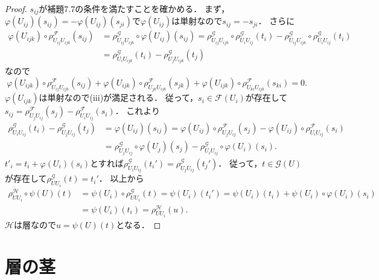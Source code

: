 \begin{proof}
  $s_{ij}$が補題7.7の条件を満たすことを確かめる．
  まず，$\varphi(U_{ij})(s_{ij}) = - \varphi(U_{ij})(s_{ji})$で$\varphi(U_{ij})$は単射なので$s_{ij} = - s_{ji}$．
  さらに
  \begin{align*}
    \varphi(U_{ijk}) \circ \rho^\mathscr{F}_{U_{ij}U_{ijk}}(s_{ij})
    &= \rho^\mathscr{G}_{U_{ij}U_{ijk}} \circ \varphi(U_{ij})(s_{ij})
    = \rho^\mathscr{G}_{U_{ij}U_{ijk}} \circ \rho^\mathscr{G}_{U_iU_{ij}}(t_i)
    - \rho^\mathscr{G}_{U_{ij}U_{ijk}} \circ \rho^\mathscr{G}_{U_iU_{ij}}(t_i) \\
    &= \rho^\mathscr{G}_{U_iU_{ijk}}(t_i) - \rho^\mathscr{G}_{U_jU_{ijk}}(t_j)
  \end{align*}
  なので
  \[
  \varphi(U_{ijk}) \circ \rho^\mathscr{F}_{U_{ij}U_{ijk}}(s_{ij})
  + \varphi(U_{ijk}) \circ \rho^\mathscr{F}_{U_{jk}U_{ijk}}(s_{jk})
  + \varphi(U_{ijk}) \circ \rho^\mathscr{F}_{U_{ki}U_{ijk}}(s_{ki})
  = 0 .
  \]
  $\varphi(U_{ijk})$は単射なので(iii)が満足される．
  従って，$s_i \in \mathscr{F}(U_i)$が存在して$s_{ij} = \rho^\mathscr{F}_{U_jU_{ij}}(s_j) - \rho^\mathscr{F}_{U_iU_{ij}}(s_i)$．
  これより
  \begin{align*}
    \rho^\mathscr{G}_{U_iU_{ij}}(t_i) - \rho^\mathscr{G}_{U_jU_{ij}}(t_j) &= \varphi(U_{ij})(s_{ij})
    = \varphi(U_{ij}) \circ \rho^\mathscr{F}_{U_jU_{ij}}(s_j) - \varphi(U_{ij}) \circ \rho^\mathscr{F}_{U_iU_{ij}}(s_i) \\
    &= \rho^\mathscr{G}_{U_jU_{ij}} \circ \varphi(U_j)(s_j) - \rho^\mathscr{G}_{U_iU_{ij}} \circ \varphi(U_i)(s_i) .
  \end{align*}
  $t'_i = t_i + \varphi(U_i)(s_i)$とすれば$\rho^\mathscr{G}_{U_iU_{ij}}(t_i') = \rho^\mathscr{G}_{U_jU_{ij}}(t_j')$．
  従って，$t \in \mathscr{G}(U)$が存在して$\rho^\mathscr{G}_{UU_i}(t) = t_i'$．
  以上から
  \begin{align*}
    \rho^\mathscr{H}_{UU_i} \circ \psi(U)(t) &= \psi(U_i) \circ \rho^\mathscr{G}_{UU_i}(t)
    = \psi(U_i)(t_i') = \psi(U_i)(t_i) + \psi(U_i)\circ\varphi(U_i)(s_i) \\
    &= \psi(U_i)(t_i) = \rho^\mathscr{H}_{UU_i}(u) .
  \end{align*}
  $\mathscr{H}$は層なので$u = \psi(U)(t)$となる．
\end{proof}

\section{層の茎}
